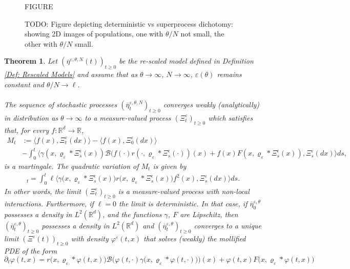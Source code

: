 \documentclass[12pt]{article}
\newtheorem{theorem}{Theorem}[section]
\newcommand{\plr}[1]{\todo[inline]{Peter: #1}}
\begin{document}
\begin{figure}
    \begin{center}
        FIGURE
    \end{center}
    \caption{
        TODO: Figure depicting deterministic vs superprocess dichotomy:
        showing 2D images of populations,
        one with $\theta/N$ not small, the other with $\theta/N$ small.
        \label{fig:super_vs_det_2d}
    }
\end{figure}


\plr{Main theorem 1:}

\begin{theorem}\label{teo: Main Convergence Theorem - non-linear superprocess}
 Let $(\overline{\eta}^{\varepsilon, \theta,N}(t))_{t \geq 0}$ be the re-scaled model defined in Definition \ref{Def: Rescaled Models} and assume that as $\theta \to \infty$, $N \to \infty$, $\varepsilon(\theta)$ remains constant and $\theta/N \to \ell$.\\~\\
    The sequence of stochastic processes $(\overline{\eta}^{\varepsilon,\theta,N}_t)_{t \geq 0}$ converges weakly (analytically) in distribution as $\theta \to \infty$ to a measure-valued process $(\Xi^\varepsilon_t)_{t \geq 0}$ which satisfies that, for every $f:\mathbb{R}^d \rightarrow \mathbb{R}$,
\begin{align*} M_t &:= \langle f(x), \Xi^\varepsilon_t(dx) \rangle - \langle f(x), \Xi^\varepsilon_0(dx) \rangle \\ &- \int_0^t \big\langle \gamma(x,\varrho_{\varepsilon}*\Xi^{\epsilon}_{s}(x)) \mathcal{B}(f(\cdot)r(\cdot,\varrho_{\varepsilon}*\Xi^{\epsilon}_{s}(\cdot))(x) + f(x)  F(x,\varrho_{\varepsilon}*\Xi^{\epsilon}_{s}(x)), \Xi^\varepsilon_s(dx) \big\rangle ds, \end{align*}
is a martingale. The quadratic variation of $M_t$ is given by 
\begin{align*}
[ M ]_t = \int_0^t \ell\big\langle\gamma\big(x,\varrho_{\varepsilon}*\Xi^{\epsilon}_{s}(x)\big) r\big(x,\varrho_{\varepsilon}*\Xi^{\epsilon}_{s}(x)\big) f^2(x), \Xi^\varepsilon_s (dx) \big\rangle ds. 
\end{align*}
In other words, the limit $(\Xi^\varepsilon_t)_{t \geq 0}$ is a measure-valued process with non-local interactions.
Furthermore, if $\ell=0$ the limit is deterministic. In that case, if $\overline{\eta}^{\varepsilon,\theta}_0$ possesses a density in $L^2(\mathbb{R}^d)$, and the functions $\gamma$, $F$ are Lipschitz, then $(\overline{\eta}^{\varepsilon,\theta}_t)_{t \geq 0}$ possesses a density in $L^2(\mathbb{R}^d)$ and  $(\overline{\eta}^{\varepsilon,\theta}_t)_{t \geq 0}$ converges to a unique limit $(\Xi^\varepsilon(t))_{t \geq 0}$ with density $\varphi^\varepsilon(t,x)$ that solves (weakly) the mollified PDE of the form
\begin{equation}\label{Eq: non-local density PDE equation}
\partial_t \varphi(t,x) = r\big(x,\varrho_{\varepsilon}*\varphi(t,x)\big) \mathcal{B} \Big(\varphi(t,\cdot)\gamma\big(x,\varrho_{\varepsilon}*\varphi(t,\cdot)\big)\Big)(x) + \varphi(t,x) F\big(x,\varrho_{\varepsilon}*\varphi(t,x)\big)    
\end{equation}
\end{theorem}
\end{document}
